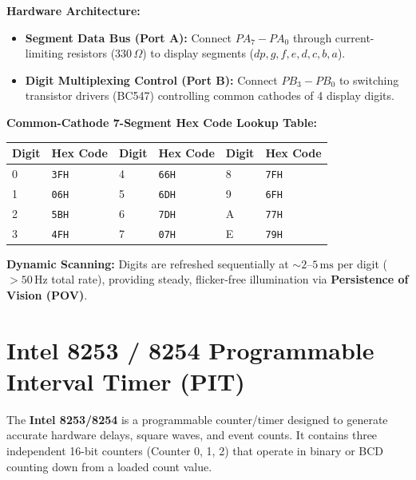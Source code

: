 \documentclass[12pt,a4paper]{article}
\begin{document}
\begin{tcolorbox}[examplebox, title={Interfacing Multiplexed 7-Segment Displays to 8255}]
\textbf{Hardware Architecture:}
\begin{itemize}[leftmargin=*, itemsep=2pt]
  \item \textbf{Segment Data Bus (Port A):} Connect $PA_7-PA_0$ through current-limiting resistors ($330\,\Omega$) to display segments ($dp, g, f, e, d, c, b, a$).
  \item \textbf{Digit Multiplexing Control (Port B):} Connect $PB_3-PB_0$ to switching transistor drivers (BC547) controlling common cathodes of 4 display digits.
\end{itemize}
\par\vspace{3pt}
\textbf{Common-Cathode 7-Segment Hex Code Lookup Table:}
\par\vspace{2pt}
\begingroup
\setlength{\extrarowheight}{2pt}
\noindent\begin{tabularx}{\linewidth}{|B{2.2cm}|B{1.6cm}|B{2.2cm}|B{1.6cm}|B{2.2cm}|Y|}
\hline
\textbf{Digit} & \textbf{Hex Code} & \textbf{Digit} & \textbf{Hex Code} & \textbf{Digit} & \textbf{Hex Code} \\  & \texttt{3FH} & 4 & \texttt{66H} & 8 & \texttt{7FH} \\  & \texttt{06H} & 5 & \texttt{6DH} & 9 & \texttt{6FH} \\  & \texttt{5BH} & 6 & \texttt{7DH} & A & \texttt{77H} \\  & \texttt{4FH} & 7 & \texttt{07H} & E & \texttt{79H} \\ \hline
\end{tabularx}\par
\endgroup
\par\vspace{3pt}
\textbf{Dynamic Scanning:} Digits are refreshed sequentially at $\sim 2\text{--}5\,\mathrm{ms}$ per digit ($>50\,\mathrm{Hz}$ total rate), providing steady, flicker-free illumination via \textbf{Persistence of Vision (POV)}.
\end{tcolorbox}

\section{Intel 8253 / 8254 Programmable Interval Timer (PIT)}

\begin{tcolorbox}[defbox, title={Intel 8253/8254 Architectural Overview}]
The \textbf{Intel 8253/8254} is a programmable counter/timer designed to generate accurate hardware delays, square waves, and event counts. It contains three independent 16-bit counters (Counter 0, 1, 2) that operate in binary or BCD counting down from a loaded count value.
\end{tcolorbox}
\end{document}
